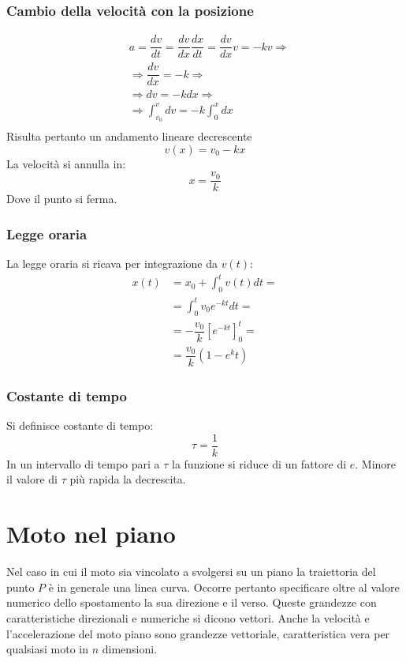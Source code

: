 		\subsubsection{Cambio della velocit\`a con la posizione}
		\begin{align*}
			&a = \dfrac{dv}{dt}=\dfrac{dv}{dx}\dfrac{dx}{dt}=\dfrac{dv}{dx}v = -kv\Rightarrow\\
			&\Rightarrow \dfrac{dv}{dx}=-k\Rightarrow\\
			&\Rightarrow dv = -kdx\Rightarrow\\
			&\Rightarrow \int_{v_0}^v dv = -k \int_0^xdx\\
		\end{align*}
		Risulta pertanto un andamento lineare decrescente
		$$v(x)=v_0-kx$$
		La velocit\`a si annulla in:
		$$x=\dfrac{v_0}{k}$$
		Dove il punto si ferma.

		\subsubsection{Legge oraria}
		La legge oraria si ricava per integrazione da $v(t)$:
		\begin{align*}
			x(t)&=x_0+\int_0^t v(t)dt=\\
			    &=\int_0^tv_0e^{-kt}dt=\\
					&=-\dfrac{v_0}{k}[e^{-kt}]_0^t=\\
					&=\dfrac{v_0}{k}(1-e^kt)
		\end{align*}

		\subsubsection{Costante di tempo}
		Si definisce costante di tempo:
		$$\tau = \dfrac{1}{k}$$
		In un intervallo di tempo pari a $\tau$ la funzione si riduce di un fattore di $e$.
		Minore il valore di $\tau$ pi\`u rapida la decrescita.

\section{Moto nel piano}
Nel caso in cui il moto sia vincolato a svolgersi su un piano la traiettoria del punto $P$ \`e in generale una linea curva.
Occorre pertanto specificare oltre al valore numerico dello spostamento la sua direzione e il verso.
Queste grandezze con caratteristiche direzionali e numeriche si dicono vettori.
Anche la velocit\`a e l'accelerazione del moto piano sono grandezze vettoriale, caratteristica vera per qualsiasi moto in $n$ dimensioni.

